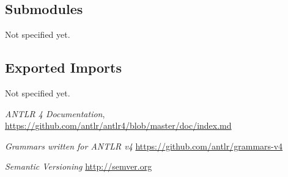 \documentclass[a4paper,12pt]{report}
\begin{document}
\subsection{Submodules}

Not specified yet.

\subsection{Exported Imports}

Not specified yet.

\clearpage

\begin{thebibliography}{0}

    \textit{ANTLR 4 Documentation},
    \url{https://github.com/antlr/antlr4/blob/master/doc/index.md}

    \textit{Grammars written for ANTLR v4}
    \url{https://github.com/antlr/grammars-v4}

    \textit{Semantic Versioning}
    \url{http://semver.org}
        
\end{thebibliography}
\end{document}
